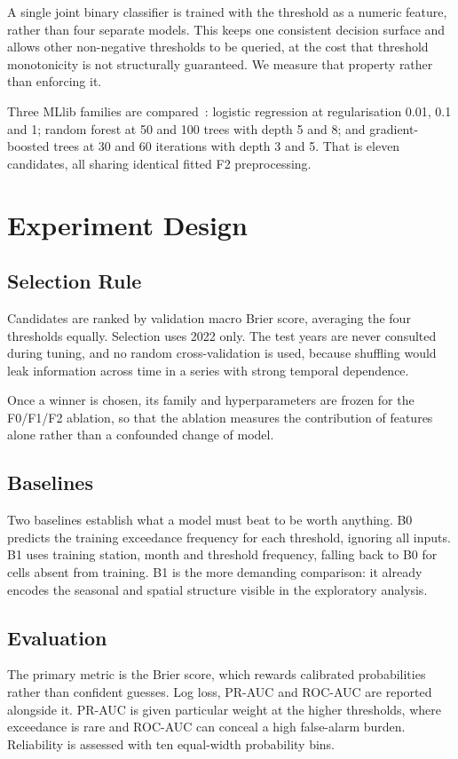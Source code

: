 \documentclass[10pt,a4paper,twocolumn,twoside]{rho-class/rho}
\begin{document}
A single joint binary classifier is trained with the threshold as a numeric feature, rather than four separate models. This keeps one consistent decision surface and allows other non-negative thresholds to be queried, at the cost that threshold monotonicity is not structurally guaranteed. We measure that property rather than enforcing it.

Three MLlib families are compared~\cite{Lecture6,SparkMLlib}: logistic regression at regularisation 0.01, 0.1 and 1; random forest at 50 and 100 trees with depth 5 and 8; and gradient-boosted trees at 30 and 60 iterations with depth 3 and 5. That is eleven candidates, all sharing identical fitted F2 preprocessing.

\section{Experiment Design}
\label{sec:method}

\subsection{Selection Rule}
Candidates are ranked by validation macro Brier score, averaging the four thresholds equally. Selection uses 2022 only. The test years are never consulted during tuning, and no random cross-validation is used, because shuffling would leak information across time in a series with strong temporal dependence.

Once a winner is chosen, its family and hyperparameters are frozen for the F0/F1/F2 ablation, so that the ablation measures the contribution of features alone rather than a confounded change of model.

\subsection{Baselines}
Two baselines establish what a model must beat to be worth anything. B0 predicts the training exceedance frequency for each threshold, ignoring all inputs. B1 uses training station, month and threshold frequency, falling back to B0 for cells absent from training. B1 is the more demanding comparison: it already encodes the seasonal and spatial structure visible in the exploratory analysis.

\subsection{Evaluation}
The primary metric is the Brier score, which rewards calibrated probabilities rather than confident guesses. Log loss, PR-AUC and ROC-AUC are reported alongside it. PR-AUC is given particular weight at the higher thresholds, where exceedance is rare and ROC-AUC can conceal a high false-alarm burden. Reliability is assessed with ten equal-width probability bins.
\end{document}
